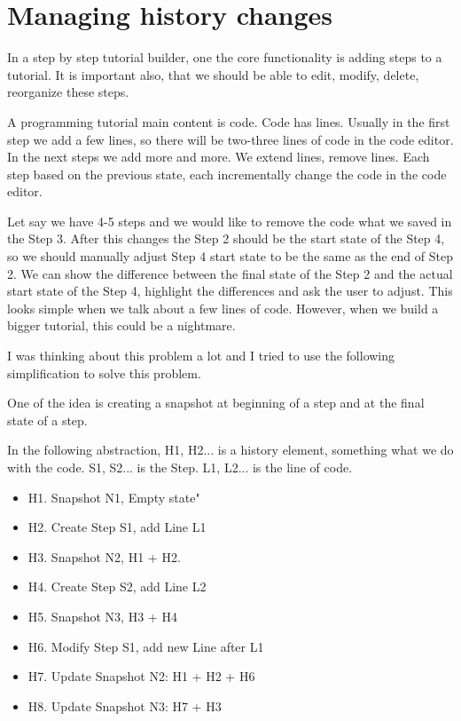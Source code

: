 \documentclass[12pt, a4paper, oneside, openright, medskipamount]{report}
\begin{document}
\section{Managing history changes}

In a step by step tutorial builder, one the core functionality is adding steps to a tutorial. It is important also, that we should be able to edit, modify, delete, reorganize these steps.

A programming tutorial main content is code. Code has lines. Usually in the first step we add a few lines, so there will be two-three lines of code in the code editor. In the next steps we add more and more. We extend lines, remove lines. Each step based on the previous state, each incrementally change the code in the code editor.

Let say we have 4-5 steps and we would like to remove the code what we saved in the Step 3. After this changes the Step 2 should be the start state of the Step 4, so we should manually adjust Step 4 start state to be the same as the end of Step 2. We can show the difference between the final state of the Step 2 and the actual start state of the Step 4, highlight the differences and ask the user to adjust. This looks simple when we talk about a few lines of code. However, when we build a bigger tutorial, this could be a nightmare.

I was thinking about this problem a lot and I tried to use the following simplification to solve this problem.

One of the idea is creating a snapshot at beginning of a step and at the final state of a step.

In the following abstraction, H1, H2... is a history element, something what we do with the code. S1, S2... is the Step. L1, L2... is the line of code.

\begin{itemize}[noitemsep]
\item H1. Snapshot N1, Empty state"
\item H2. Create Step S1, add Line L1
\item H3. Snapshot N2, H1 + H2.
\item H4. Create Step S2, add Line L2
\item H5. Snapshot N3, H3 + H4
\item H6. Modify Step S1, add new Line after L1
\item H7. Update Snapshot N2: H1 + H2 + H6
\item H8. Update Snapshot N3: H7 + H3
\end{itemize}
\end{document}
